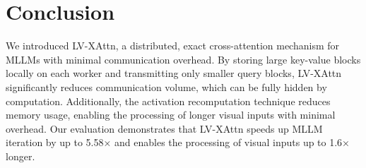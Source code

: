 \section{Conclusion}
We introduced LV-XAttn, a distributed, exact cross-attention mechanism for MLLMs with minimal communication overhead. By storing large key-value blocks locally on each worker and transmitting only smaller query blocks, LV-XAttn significantly reduces communication volume, which can be fully hidden by computation. Additionally, the activation recomputation technique reduces memory usage, enabling the processing of longer visual inputs with minimal overhead. Our evaluation demonstrates that LV-XAttn speeds up MLLM iteration by up to 5.58× and enables the processing of visual inputs up to 1.6× longer.